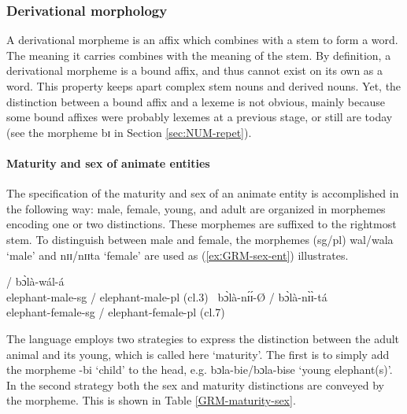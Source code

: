\begin{exe}
\begin{exe}
\begin{exe}
\begin{exe}
\begin{exe}
\begin{exe}
\subsubsection{Derivational morphology}
\label{sec:GRM-der-morph}

A derivational morpheme is an affix which combines with a stem to form a word. The meaning it carries combines with the meaning of the stem.  By definition, a derivational morpheme is a bound affix, and  thus cannot exist on its own as a word. This property keeps apart complex stem nouns and derived nouns. Yet, the distinction between a bound affix and a lexeme is not obvious, mainly because some bound affixes were probably lexemes at a previous stage, or still are today (see the morpheme {\sls bɪ} in Section \ref{sec:NUM-repet}). 

\paragraph{Maturity and sex of animate entities}
\label{sec:GRM-der-matur}

The specification of the maturity and sex of an animate entity is accomplished in the following way: male, female, young, and adult are organized in morphemes encoding one or two distinctions. These morphemes are suffixed to the rightmost stem. To distinguish between male and female, the morphemes ({\sc sg}/{\sc pl}) {\sls wal/wala} `male'  and {\sls nɪɪ/nɪɪta} `female'  are used as (\ref{exːGRM-sex-ent}) illustrates.

\ea\label{exːGRM-sex-ent}
 
  /  {\sls bɔ̀là-wál-á}\\
{\rm elephant-male-{\sc sg} / elephant-male-{\sc pl}   ({\sc cl.3})}
 \ex\  {\sls bɔ̀là-nɪ́ɪ́-\O}  / {\sls bɔ̀là-nɪ̀ɪ̀-tá}\\
{\rm elephant-female-{\sc sg} / elephant-female-{\sc pl} ({\sc cl.7})}
 
 
\z 
 \z

The language employs two strategies to express the distinction between  the adult animal and its young, which is  called here `maturity'.  The first is to simply add the morpheme {\sls -bi} `child'  to the head, e.g. {\sls bɔla-bie/bɔla-bise} `young elephant(s)'. In the second strategy both the sex and maturity distinctions are conveyed by the morpheme.  This is shown in Table \ref{GRM-maturity-sex}. 

\begin{table}


\end{table}
\end{exe}
\end{exe}
\end{exe}
\end{exe}
\end{exe}
\end{exe}
